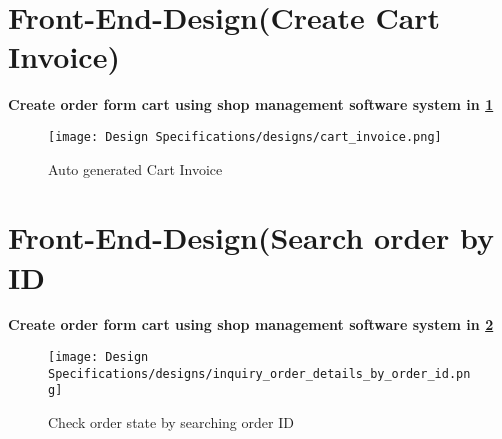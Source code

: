 \section{Front-End-Design(Create Cart Invoice)}
\vspace{1 cm}
\textbf{Create order form cart using shop management software system in \ref{fig:fig 5.7}}\\
\begin{figure}[ht]
    \centering  
    \texttt{[image: Design Specifications/designs/cart\_invoice.png]}    
    \caption{Auto generated Cart Invoice}
    \label{fig:fig 5.7}
\end{figure}
\vspace{1 cm}
\section{Front-End-Design(Search order by ID}
\textbf{Create order form cart using shop management software system in \ref{fig:fig5.8}}\\
\begin{figure}[ht]
    \centering  
    \texttt{[image: Design Specifications/designs/inquiry\_order\_details\_by\_order\_id.png]}    
    \caption{Check order state by searching order ID}
    \label{fig:fig5.8}
\end{figure}


